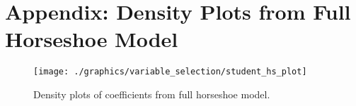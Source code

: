 \chapter{Appendix: Density Plots from Full Horseshoe Model}
\label{appendix:horseshoe_plot}

\begin{figure}
    \texttt{[image: ./graphics/variable\_selection/student\_hs\_plot]}
    \caption{Density plots of coefficients from full horseshoe model.}
    \label{fig:hs_dens}
\end{figure}
